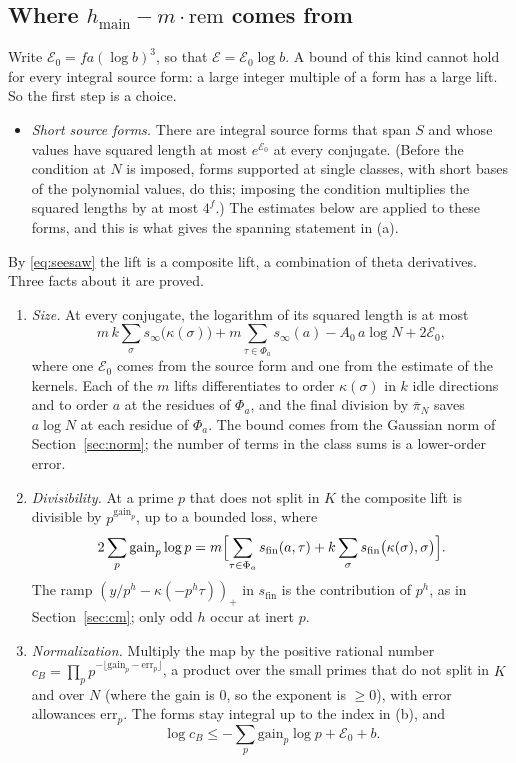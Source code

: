 \documentclass[11pt]{amsart}
\numberwithin{equation}{section}
\theoremstyle{definition}
\theoremstyle{remark}
\begin{document}
\subsection*{Where $h_{\mathrm{main}}-m\cdot\mathrm{rem}$ comes from}
Write $\mathcal E_0=fa(\log b)^3$, so that $\mathcal E=\mathcal E_0\log b$. A bound of this kind cannot hold for every integral source form: a large integer multiple of a form has a large lift. So the first step is a choice.
\begin{itemize}[leftmargin=2em]
\item \emph{Short source forms.} There are integral source forms that span $S$ and whose values have squared length at most $e^{\mathcal E_0}$ at every conjugate. (Before the condition at $N$ is imposed, forms supported at single classes, with short bases of the polynomial values, do this; imposing the condition multiplies the squared lengths by at most $4^f$.) The estimates below are applied to these forms, and this is what gives the spanning statement in (a).
\end{itemize}
By \eqref{eq:seesaw} the lift is a composite lift, a combination of theta derivatives. Three facts about it are proved.
\begin{enumerate}[leftmargin=2em]
\item \emph{Size.} At every conjugate, the logarithm of its squared length is at most
\begin{equation}
 m\,k\sum_{\sigma}s_\infty\bigl(\kappa(\sigma)\bigr)+m\sum_{\tau\in\Phi_a}s_\infty(a)-A_0\,a\log N+2\mathcal E_0,
\end{equation}
where one $\mathcal E_0$ comes from the source form and one from the estimate of the kernels. Each of the $m$ lifts differentiates to order $\kappa(\sigma)$ in $k$ idle directions and to order $a$ at the residues of $\Phi_a$, and the final division by $\bar\pi_N$ saves $a\log N$ at each residue of $\Phi_a$. The bound comes from the Gaussian norm of Section~\ref{sec:norm}; the number of terms in the class sums is a lower-order error.
\item \emph{Divisibility.} At a prime $p$ that does not split in $K$ the composite lift is divisible by $p^{\mathrm{gain}_p}$, up to a bounded loss, where
\begin{equation}
 2\sum_p\mathrm{gain}_p\log p=m\Bigl[\sum_{\tau\in\Phi_a}s_{\mathrm{fin}}(a,\tau)+k\sum_\sigma s_{\mathrm{fin}}\bigl(\kappa(\sigma),\sigma\bigr)\Bigr].
\end{equation}
The ramp $(y/p^h-\kappa(-p^h\tau))_+$ in $s_{\mathrm{fin}}$ is the contribution of $p^h$, as in Section~\ref{sec:cm}; only odd $h$ occur at inert $p$.
\item \emph{Normalization.} Multiply the map by the positive rational number $c_B=\prod_pp^{-\lfloor\mathrm{gain}_p-\mathrm{err}_p\rfloor}$, a product over the small primes that do not split in $K$ and over $N$ (where the gain is $0$, so the exponent is $\ge0$), with error allowances $\mathrm{err}_p$. The forms stay integral up to the index in (b), and
\begin{equation}
 \log c_B\le-\sum_p\mathrm{gain}_p\log p+\mathcal E_0+b .
\end{equation}
\end{enumerate}
\end{document}
